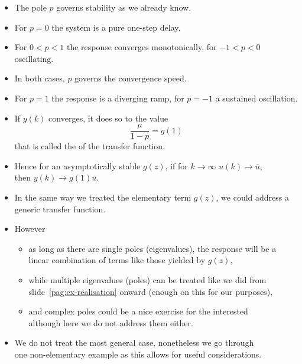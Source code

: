 \begin{frame}
\myPause
 \begin{itemize}[<+-| alert@+>]
 \item The pole $p$ governs stability as we already know.
 \item For $p=0$ the system is a pure one-step delay.
 \item For $0<p<1$ the response converges monotonically, for $-1<p<0$ oscillating.
 \item In both cases, $p$ governs the convergence speed.
 \item For $p=1$ the response is a diverging ramp, for $p=-1$ a sustained oscillation.
 \item If $y(k)$ converges, it does so to the value
       \begin{displaymath}
        \frac{\mu}{1-p} = g(1)
       \end{displaymath}
       that is called the  of the transfer function.
 \item Hence for an asymptotically stable $g(z)$, if for $k\rightarrow\infty$ $u(k)\rightarrow\overline{u}$,\\
       then $y(k)\rightarrow g(1)\overline{u}$.
 \end{itemize}
\end{frame}

\begin{frame}
\framesubtitleTC{}
\myPause
 \begin{itemize}[<+-| alert@+>]
 \item In the same way we treated the elementary term $g(z)$, we could address a generic transfer function.
 \item However
       \begin{itemize}[<+-| alert@+>]
       \item as long as there are single poles (eigenvalues), the response will be a linear 
             combination of terms like those yielded by $g(z)$,
       \item while multiple eigenvalues (poles) can be treated like we did from slide~\ref{pag:ex-realisation}
             onward (enough on this for our purposes),
       \item and complex poles could be a nice exercise for the interested \smiley\\
             although here we do not address them either.
       \end{itemize}
 \item We do not treat the most general case, nonetheless we go through\\
       one non-elementary example as this allows for useful considerations.
 \end{itemize}
\end{frame}

